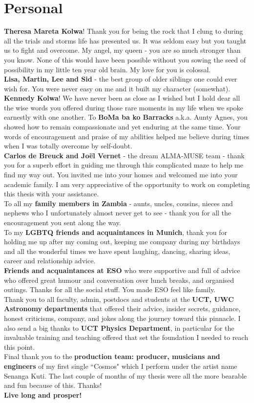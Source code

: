 \section*{Personal}
{\bf Theresa Mareta Kolwa}! Thank you for being the rock that I clung to during all the trials and storms life has presented us. It was seldom easy but you taught us to fight and overcome. My angel, my queen - you are so much stronger than you know. None of this would have been possible without you sowing the seed of possibility in my little ten year old brain. My love for you is colossal. \\
{\bf Lisa, Martin, Lee and Sid} - the best group of older siblings one could ever wish for. You were never easy on me and it built my character (somewhat). {\bf Kennedy Kolwa}! We have never been as close as I wished but I hold dear all the wise words you offered during those rare moments in my life when we spoke earnestly with one another. To {\bf BoMa ba ko Barracks} a.k.a. Aunty Agnes, you showed how to remain compassionate and yet enduring at the same time. Your words of encouragement and praise of my abilities helped me believe during times when I was totally overcome by self-doubt. \\
{\bf Carlos de Breuck and Jo\"el Vernet} - the dream ALMA-MUSE team - thank you for a superb effort in guiding me through this complicated maze to help me find my way out. You invited me into your homes and welcomed me into your academic family. I am very appreciative of the opportunity to work on completing this thesis with your assistance.  \\
To all my {\bf family members in Zambia} - aunts, uncles, cousins, nieces and nephews who I unfortunately almost never get to see - thank you for all the encouragement you sent along the way. \\
To my {\bf LGBTQ friends and acquaintances in Munich}, thank you for holding me up after my coming out, keeping me company during my birthdays and all the wonderful times we have spent laughing, dancing, sharing ideas, career and relationship advice. \\
{\bf Friends and acquaintances at ESO} who were supportive and full of advice who offered great humour and conversation over lunch breaks, and organised outings. Thanks for all the social stuff. You made ESO feel like family. \\
Thank you to all faculty, admin, postdocs and students at the {\bf UCT, UWC Astronomy departments} that offered their advice, insider secrets, guidance, honest criticisms, company, and jokes along the journey toward this pinnacle. I also send a big thanks to {\bf UCT Physics Department}, in particular for the invaluable training and teaching offered that set the foundation I needed to reach this point. \\
Final thank you to the {\bf production team: producer, musicians and engineers} of my first single ``Cosmos" which I perform under the artist name Senanga Kuti. The last couple of months of my thesis were all the more bearable and fun because of this. Thanks! \\
{\bf Live long and prosper!}\\